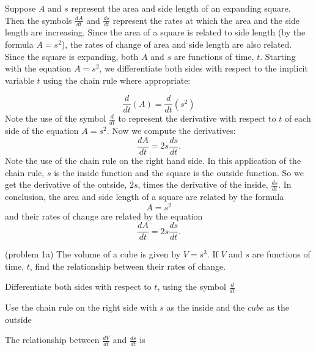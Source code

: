 \documentclass{ximera}
\begin{document}
\begin{example}[example 1]
Suppose $A$ and $s$ represent the area and side length of an expanding square. 
Then the symbols $\frac{dA}{dt}$ and $\frac{ds}{dt}$ represent the rates at which 
the area and the side length are increasing. Since the area of a square is related 
to side length (by the formula $A = s^2$), the rates of change of area and side 
length are also related. Since the square is expanding, both $A$ and $s$ are 
functions of time, $t$.
Starting with the equation $A = s^2$, we differentiate both sides with respect 
to the implicit variable $t$ using the chain rule where appropriate:

\[\frac{d}{dt} (A) = \frac{d}{dt}(s^2) \]
Note the use of the symbol $\frac{d}{dt}$ to represent the derivative with 
respect to $t$ of each side of the equation $A = s^2$. Now we compute the derivatives:
\[\frac{dA}{dt}  = 2s\frac{ds}{dt}. \]
Note the use of the chain rule on the right hand side. In this application of the 
chain rule, $s$ is the inside function and the square is the outside function. 
So we get the derivative of the outside, $2s$, times the derivative of the inside, $\frac{ds}{dt}$.
In conclusion, the area and side length of a square are related by the formula
\[A = s^2\]
and their rates of change are related by the equation
\[\frac{dA}{dt} = 2s \frac{ds}{dt}.\]
\end{example}


\begin{problem}(problem 1a)
The volume of a cube is given by $V = s^3$. If $V$ and $s$ are functions of time, $t$, 
find the relationship between their rates of change.\\
\begin{hint}
Differentiate both sides with respect to $t$, using the symbol $\frac{d}{dt}$
\end{hint}
\begin{hint}
Use the chain rule on the right side with $s$ as the inside and the $cube$ as the outside
\end{hint}

The relationship between $\frac{dV}{dt}$ and $\frac{ds}{dt}$ is
\begin{multipleChoice}
\end{multipleChoice}
\end{problem}
\end{document}
